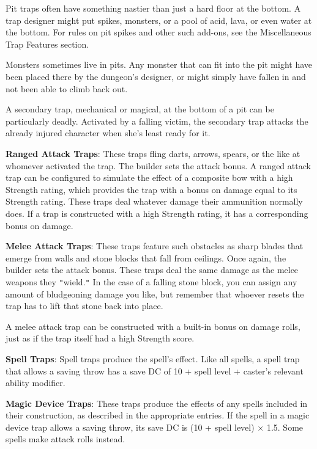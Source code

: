 Pit traps often have something nastier than just a hard floor at the bottom. A trap designer might put spikes, monsters, or a pool of acid, lava, or even water at the bottom. For rules on pit spikes and other such add-ons, see the Miscellaneous Trap Features section.
				
Monsters sometimes live in pits. Any monster that can fit into the pit might have been placed there by the dungeon's designer, or might simply have fallen in and not been able to climb back out. 
				
A secondary trap, mechanical or magical, at the bottom of a pit can be particularly deadly. Activated by a falling victim, the secondary trap attacks the already injured character when she's least ready for it.
				
\textbf{Ranged Attack Traps}: These traps fling darts, arrows, spears, or the like at whomever activated the trap. The builder sets the attack bonus. A ranged attack trap can be configured to simulate the effect of a composite bow with a high Strength rating, which provides the trap with a bonus on damage equal to its Strength rating. These traps deal whatever damage their ammunition normally does. If a trap is constructed with a high Strength rating, it has a corresponding bonus on damage.
				
\textbf{Melee Attack Traps}: These traps feature such obstacles as sharp blades that emerge from walls and stone blocks that fall from ceilings. Once again, the builder sets the attack bonus. These traps deal the same damage as the melee weapons they \texttt{{}"{}}wield.\texttt{{}"{}} In the case of a falling stone block, you can assign any amount of bludgeoning damage you like, but remember that whoever resets the trap has to lift that stone back into place. 
				
A melee attack trap can be constructed with a built-in bonus on damage rolls, just as if the trap itself had a high Strength score.
				
\textbf{Spell Traps}: Spell traps produce the spell's effect\textit{. }Like all spells, a spell trap that allows a saving throw has a save DC of 10 + spell level + caster's relevant ability modifier.
				
\textbf{Magic Device Traps}: These traps produce the effects of any spells included in their construction, as described in the appropriate entries\textit{. }If the spell in a magic device trap allows a saving throw, its save DC is (10 + spell level) \mbox{$\times$} 1.5. Some spells make attack rolls instead.
				
